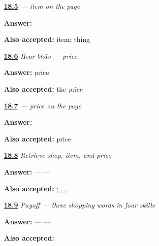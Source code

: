 \noindent\begin{minipage}[t]{\linewidth}
\raggedright
\hyperlink{review-MW-C13-vastu-dictation}{\textbf{18.5}} \emph{ — item on the page}\par
\small \textbf{Answer:} \par
\footnotesize \textbf{Also accepted:}  item;  thing
\end{minipage}\par\medskip

\noindent\begin{minipage}[t]{\linewidth}
\raggedright
\hyperlink{review-MW-C13-hear-bhaav-meaning}{\textbf{18.6}} \emph{Hear \emph{bhāv} — price}\par
\small \textbf{Answer:} price\par
\footnotesize \textbf{Also accepted:} the price
\end{minipage}\par\medskip

\noindent\begin{minipage}[t]{\linewidth}
\raggedright
\hyperlink{review-MW-C13-bhaav-dictation}{\textbf{18.7}} \emph{ — price on the page}\par
\small \textbf{Answer:} \par
\footnotesize \textbf{Also accepted:}  price
\end{minipage}\par\medskip

\noindent\begin{minipage}[t]{\linewidth}
\raggedright
\hyperlink{review-MW-R13-shopping-three-recall}{\textbf{18.8}} \emph{Retrieve shop, item, and price}\par
\small \textbf{Answer:}  —  — \par
\footnotesize \textbf{Also accepted:}   ; , , 
\end{minipage}\par\medskip

\noindent\begin{minipage}[t]{\linewidth}
\raggedright
\hyperlink{review-MW-C13-shopping-three-payoff}{\textbf{18.9}} \emph{Payoff — three shopping words in four skills}\par
\small \textbf{Answer:}  —  — \par
\footnotesize \textbf{Also accepted:}   
\end{minipage}\par\medskip

